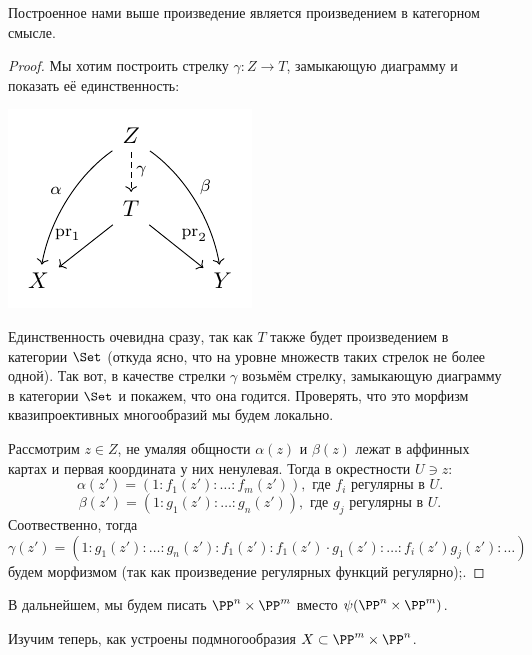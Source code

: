  	\begin{statement} 
 		Построенное нами выше произведение является произведением в категорном смысле. 
 	\end{statement}
 	\begin{proof}
 		Мы хотим построить стрелку $\gamma\colon Z \to T$, замыкающую диаграмму и показать её единственность: 

 		\begin{center}
 			\includegraphics{lectures/5/pictures/cd_6.pdf}
 		\end{center}

 		Единственность очевидна сразу, так как $T$ также будет произведением в категории $\Set$ (откуда ясно, что на уровне множеств таких стрелок не более одной). Так вот, в качестве стрелки $\gamma$ возьмём стрелку, замыкающую диаграмму в категории $\Set$ и покажем, что она годится. Проверять, что это морфизм квазипроективных многообразий мы будем локально. 

 		Рассмотрим $z \in Z$, не умаляя общности $\alpha(z)$ и $\beta(z)$ лежат в аффинных картах и первая координата у них ненулевая. Тогда в окрестности $U \ni z$:
 		\[
 			\alpha(z') = (1 : f_1(z') : \ldots : f_m(z')), \text{ где } f_i \text{ регулярны в } U.
  		\]
  		\[
  			\beta(z') = (1 : g_1(z') : \ldots : g_n(z')), \text{ где } g_j \text{ регулярны в } U.
  		\]
  		Соотвественно, тогда 
  		\[
  			\gamma(z') = (1 : g_1(z') : \ldots : g_n(z') : f_1(z') : f_1(z') \cdot g_1(z') : \ldots : f_i(z') g_j(z') : \ldots)
  		\]
  		будем морфизмом (так как произведение регулярных функций регулярно);. 
 	\end{proof}

 	\begin{remark}
 		В дальнейшем, мы будем писать $\PP^n \times \PP^m$ вместо $\psi(\PP^n \times \PP^m)$. 
 	\end{remark}

 	Изучим теперь, как устроены подмногообразия  $X \subset \PP^m \times \PP^n$. 

